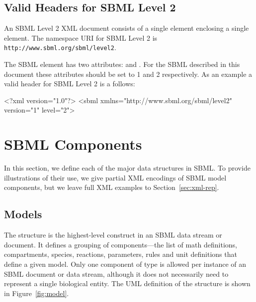 \documentclass[10pt]{cekarticle}
\newcommand{\vref}[1]{\ref{#1}}
\begin{document}
\subsection{Valid Headers for SBML Level 2}
\label{sec:header}
An SBML Level 2 XML document consists of a single 
element enclosing a single  element.  The namespace
URI for SBML Level 2 is \texttt{http://www.sbml.org/sbml/level2}.

The SBML element has two attributes:  and
.  For the SBML described in this document these
attributes should be set to 1 and 2 respectively.  As an example a
valid header for SBML Level 2 is a follows:

\begin{example}
<?xml version="1.0"?>
<sbml xmlns="http://www.sbml.org/sbml/level2" version="1" level="2">
\end{example}

\section{SBML Components}
\label{sec:elements}

In this section, we define each of the major data structures in SBML. To
provide illustrations of their use, we give partial XML encodings of SBML
model components, but we leave full XML examples to
Section~\ref{sec:xml-rep}.


\subsection{Models}
\label{sec:model}

The  structure is the highest-level construct in an
SBML data stream or document.  It defines a grouping of
components---the list of math definitions, compartments, species,
reactions, parameters, rules and unit definitions that
define a given model. Only one component of type  is
allowed per instance of an SBML document or data stream, although
it does not necessarily need to represent a single biological
entity.  The UML definition of the  structure is
shown in Figure~\vref{fig:model}.
\end{document}

